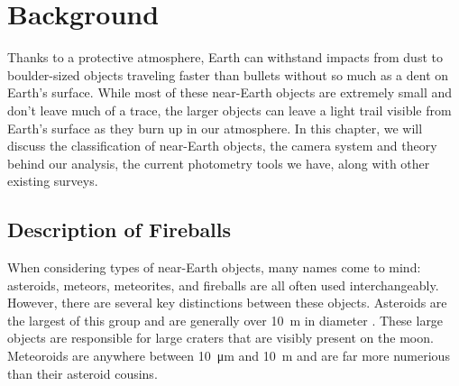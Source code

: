 \chapter{Background}

Thanks to a protective atmosphere, Earth can withstand impacts from dust to boulder-sized objects traveling faster than bullets without so much as a dent on Earth's surface.
While most of these near-Earth objects are extremely small and don't leave much of a trace, the larger objects can leave a light trail visible from Earth's surface as they burn up in our atmosphere.
In this chapter, we will discuss the classification of near-Earth objects, the camera system and theory behind our analysis, the current photometry tools we have, along with other existing surveys.


\section{Description of Fireballs}

When considering types of near-Earth objects, many names come to mind: asteroids, meteors, meteorites, and fireballs are all often used interchangeably. 
However, there are several key distinctions between these objects.  
Asteroids are the largest of this group and are generally over \SI{10}{\meter} in diameter \cite{steel_meteoroid_1996}. 
These large objects are responsible for large craters that are visibly present on the moon.  
Meteoroids are anywhere between \SI{10}{\micro\meter} and \SI{10}{\meter} and are far more numerious than their asteroid cousins.  

